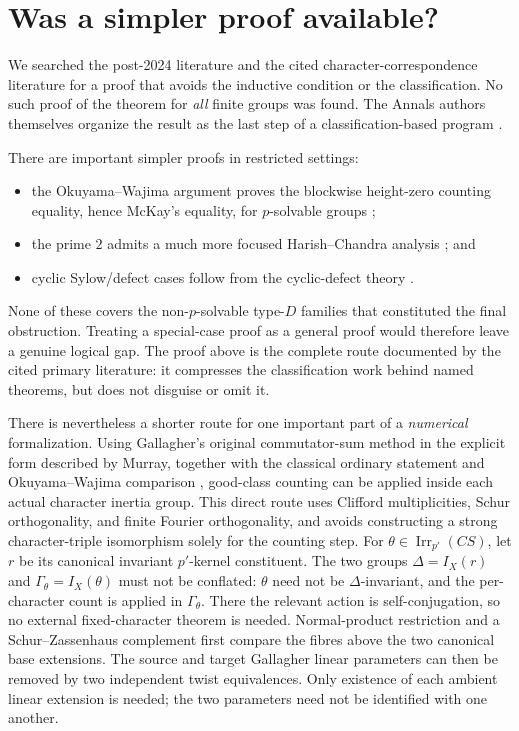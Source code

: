 \documentclass[11pt]{article}
\newcommand{\Irr}{\operatorname{Irr}}
\begin{document}
\section{Was a simpler proof available?}

We searched the post-2024 literature and the cited character-correspondence
literature for a proof that avoids the inductive condition or the
classification.  No such proof of the theorem for \emph{all} finite
groups was found.  The Annals authors themselves organize the result as
the last step of a classification-based program
\cite{CabanesSpath2026}.

There are important simpler proofs in restricted settings:

\begin{itemize}
  \item the Okuyama--Wajima argument proves the blockwise height-zero
  counting equality, hence McKay's equality, for \(p\)-solvable groups
  \cite{OkuyamaWajima1980};
  \item the prime \(2\) admits a much more focused Harish--Chandra
  analysis \cite{MalleSpath2016}; and
  \item cyclic Sylow/defect cases follow from the cyclic-defect theory
  \cite{KoshitaniSpath2016}.
\end{itemize}

None of these covers the non-\(p\)-solvable type-\(D\) families that
constituted the final obstruction.  Treating a special-case proof as a
general proof would therefore leave a genuine logical gap.  The proof
above is the complete route documented by the cited primary literature:
it compresses the classification work behind named theorems, but does
not disguise or omit it.

There is nevertheless a shorter route for one important part of a
\emph{numerical} formalization.  Using Gallagher's original
commutator-sum method in the explicit form described by Murray, together
with the classical ordinary statement and Okuyama--Wajima comparison
\cite{Gallagher1971,Murray2023,Navarro2018,OkuyamaWajima1980}, good-class counting can
be applied inside each actual character inertia group.  This direct route
uses Clifford multiplicities, Schur orthogonality, and finite Fourier
orthogonality, and avoids constructing a strong character-triple
isomorphism solely for the counting step.  For
\(\theta\in\Irr_{p'}(CS)\), let \(r\) be its canonical invariant
\(p'\)-kernel constituent.  The two groups
\(\Delta=I_X(r)\) and \(\Gamma_\theta=I_X(\theta)\) must not be
conflated: \(\theta\) need not be \(\Delta\)-invariant, and the
per-character count is applied in \(\Gamma_\theta\).  There the relevant
action is self-conjugation, so no external fixed-character theorem is
needed.  Normal-product
restriction and a Schur--Zassenhaus complement first compare the fibres
above the two canonical base extensions.  The source and target Gallagher
linear parameters can then be removed by two independent twist
equivalences.  Only existence of each ambient linear extension is needed;
the two parameters need not be identified with one another.
\end{document}
